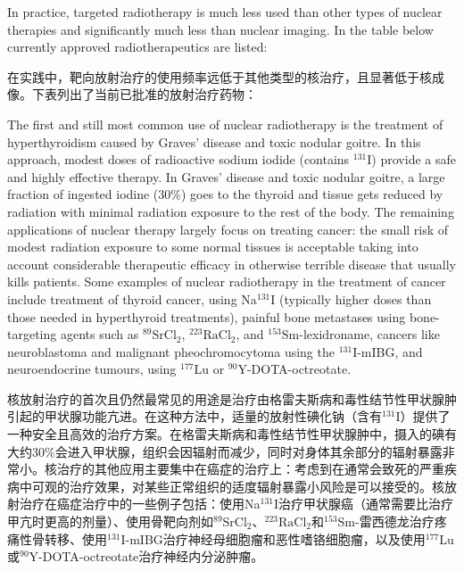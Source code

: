 \documentclass[dvipsnames, svgnames,a4paper,11pt]{article}
\begin{document}
In practice, targeted radiotherapy is much less used than other types of nuclear therapies and significantly much less than nuclear imaging. In the table below currently approved radiotherapeutics are listed:

在实践中，靶向放射治疗的使用频率远低于其他类型的核治疗，且显著低于核成像。下表列出了当前已批准的放射治疗药物：

The first and still most common use of nuclear radiotherapy is the treatment of hyperthyroidism caused by Graves’ disease and toxic nodular goitre. In this approach, modest doses of radioactive sodium iodide (contains ${}^\text{131}\text{I}$) provide a safe and highly effective therapy. In Graves’ disease and toxic nodular goitre, a large fraction of ingested iodine (30\%) goes to the thyroid and tissue gets reduced by radiation with minimal radiation exposure to the rest of the body. The remaining applications of nuclear therapy largely focus on treating cancer: the small risk of modest radiation exposure to some normal tissues is acceptable taking into account considerable therapeutic efficacy in otherwise terrible disease that usually kills patients. Some examples of nuclear radiotherapy in the treatment of cancer include treatment of thyroid cancer, using Na${}^\text{131}\text{I}$ (typically higher doses than those needed in hyperthyroid treatments), painful bone metastases using bone-targeting agents such as ${}^\text{89}\text{SrCl}_2$, ${}^\text{223}\text{RaCl}_2$, and ${}^\text{153}\text{Sm}$-lexidroname, cancers like neuroblastoma and malignant pheochromocytoma using the ${}^\text{131}\text{I}$-mIBG, and neuroendocrine tumours, using ${}^\text{177}\text{Lu}$ or ${}^\text{90}\text{Y}$-DOTA-octreotate.

核放射治疗的首次且仍然最常见的用途是治疗由格雷夫斯病和毒性结节性甲状腺肿引起的甲状腺功能亢进。在这种方法中，适量的放射性碘化钠（含有${}^\text{131}\text{I}$）提供了一种安全且高效的治疗方案。在格雷夫斯病和毒性结节性甲状腺肿中，摄入的碘有大约30\%会进入甲状腺，组织会因辐射而减少，同时对身体其余部分的辐射暴露非常小。核治疗的其他应用主要集中在癌症的治疗上：考虑到在通常会致死的严重疾病中可观的治疗效果，对某些正常组织的适度辐射暴露小风险是可以接受的。核放射治疗在癌症治疗中的一些例子包括：使用Na${}^\text{131}\text{I}$治疗甲状腺癌（通常需要比治疗甲亢时更高的剂量）、使用骨靶向剂如${}^\text{89}\text{SrCl}_2$、${}^\text{223}\text{RaCl}_2$和${}^\text{153}\text{Sm}$-雷西德龙治疗疼痛性骨转移、使用${}^\text{131}\text{I}$-mIBG治疗神经母细胞瘤和恶性嗜铬细胞瘤，以及使用${}^\text{177}\text{Lu}$或${}^\text{90}\text{Y}$-DOTA-octreotate治疗神经内分泌肿瘤。
\end{document}
